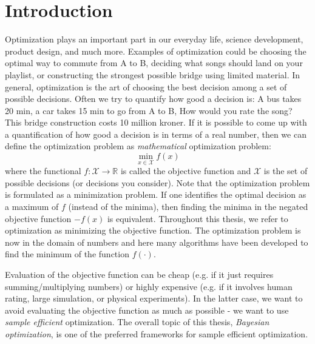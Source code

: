 \chapter{Introduction}

Optimization plays an important part in our everyday life, science development, product design, and
much more. Examples of optimization could be choosing the optimal way to commute from A to B,
deciding what songs should land on your playlist, or constructing the strongest possible bridge using
limited material. In general, optimization is the art of choosing the best decision among a set of possible
decisions. Often we try to quantify how good a decision is: A bus takes 20 min, a car takes 15 min to go from A to B, How would
you rate the song? This bridge construction costs 10 million kroner. If it is possible to come up with a
quantification of how good a decision is in terms of a real number, then we can define the optimization problem as
\textit{mathematical} optimization problem: 
$$\min_{x\in \mathcal{X}} f(x)$$ where the functional $f: \mathcal{X} \rightarrow \mathbb{R}$ is
called the objective function and $\mathcal{X}$ is the set of possible decisions (or decisions you
consider). Note that the optimization problem is formulated as a minimization problem. If one identifies
the optimal decision as a maximum of $f$ (instead of the minima), then finding the minima in the
negated objective function $-f(x)$ is equivalent. Throughout this thesis, we refer to
optimization as minimizing the objective function. The optimization problem is now in the domain of 
numbers and here many algorithms have been developed to find the minimum of the function
$f(\cdot)$.

Evaluation of the objective function can be cheap (e.g. if it just requires summing/multiplying
numbers) or highly expensive (e.g. if it involves human rating, large simulation, or physical
experiments). In the latter case, we want to avoid evaluating the objective function as much as
possible - we want to use \textit{sample efficient} optimization. The overall topic of this
thesis, \textit{Bayesian optimization}, is one of the preferred frameworks for sample efficient optimization. 


